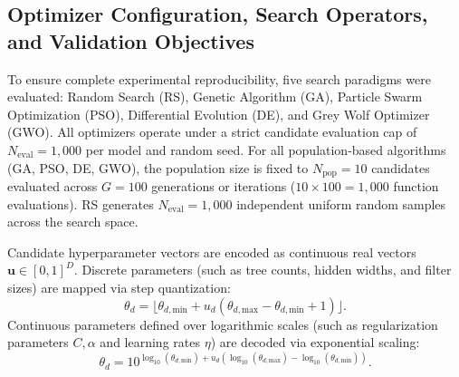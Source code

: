 \subsection{Optimizer Configuration, Search Operators, and Validation Objectives}
\label{sec:optimizerconfiguration}

To ensure complete experimental reproducibility, five search paradigms were evaluated: Random Search (RS), Genetic Algorithm (GA), Particle Swarm Optimization (PSO), Differential Evolution (DE), and Grey Wolf Optimizer (GWO). All optimizers operate under a strict candidate evaluation cap of $N_{\mathrm{eval}} = 1{,}000$ per model and random seed. For all population-based algorithms (GA, PSO, DE, GWO), the population size is fixed to $N_{\mathrm{pop}} = 10$ candidates evaluated across $G = 100$ generations or iterations ($10 \times 100 = 1{,}000$ function evaluations). RS generates $N_{\mathrm{eval}} = 1{,}000$ independent uniform random samples across the search space.

Candidate hyperparameter vectors are encoded as continuous real vectors $\mathbf{u} \in [0, 1]^D$. Discrete parameters (such as tree counts, hidden widths, and filter sizes) are mapped via step quantization:
\begin{equation}\label{eq:decoding_discrete}
\theta_d = \lfloor \theta_{d,\mathrm{min}} + u_d (\theta_{d,\mathrm{max}} - \theta_{d,\mathrm{min}} + 1) \rfloor.
\end{equation}
Continuous parameters defined over logarithmic scales (such as regularization parameters $C, \alpha$ and learning rates $\eta$) are decoded via exponential scaling:
\begin{equation}\label{eq:decoding_log}
\theta_d = 10^{\log_{10}(\theta_{d,\mathrm{min}}) + u_d (\log_{10}(\theta_{d,\mathrm{max}}) - \log_{10}(\theta_{d,\mathrm{min}}))}.
\end{equation}

